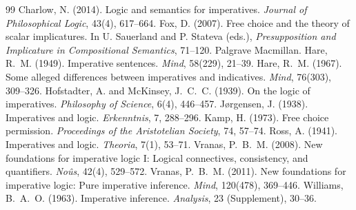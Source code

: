 \documentclass{situationist-preprint}
\begin{document}
\begin{thebibliography}{99}\small
{} Charlow, N. (2014). Logic and semantics for imperatives. \emph{Journal of Philosophical Logic}, 43(4), 617--664.
 Fox, D. (2007). Free choice and the theory of scalar implicatures. In U. Sauerland and P. Stateva (eds.), \emph{Presupposition and Implicature in Compositional Semantics}, 71--120. Palgrave Macmillan.
 Hare, R.~M. (1949). Imperative sentences. \emph{Mind}, 58(229), 21--39.
 Hare, R.~M. (1967). Some alleged differences between imperatives and indicatives. \emph{Mind}, 76(303), 309--326.
 Hofstadter, A. and McKinsey, J.~C.~C. (1939). On the logic of imperatives. \emph{Philosophy of Science}, 6(4), 446--457.
 Jørgensen, J. (1938). Imperatives and logic. \emph{Erkenntnis}, 7, 288--296.
 Kamp, H. (1973). Free choice permission. \emph{Proceedings of the Aristotelian Society}, 74, 57--74.
 Ross, A. (1941). Imperatives and logic. \emph{Theoria}, 7(1), 53--71.
 Vranas, P.~B.~M. (2008). New foundations for imperative logic I: Logical connectives, consistency, and quantifiers. \emph{Noûs}, 42(4), 529--572.
 Vranas, P.~B.~M. (2011). New foundations for imperative logic: Pure imperative inference. \emph{Mind}, 120(478), 369--446.
 Williams, B.~A.~O. (1963). Imperative inference. \emph{Analysis}, 23 (Supplement), 30--36.
\end{thebibliography}
\end{document}
